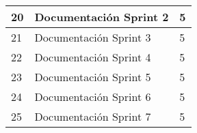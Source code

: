 \begin{tabular}{|l|l|l|}
	20 & Documentación Sprint 2                                     & 5  \\ \hline
	21 & Documentación Sprint 3                                     & 5  \\ \hline
	22 & Documentación Sprint 4                                     & 5  \\ \hline
	23 & Documentación Sprint 5                                     & 5  \\ \hline
	24 & Documentación Sprint 6                                     & 5  \\ \hline
	25 & Documentación Sprint 7                                     & 5  \\ \hline
\end{tabular}